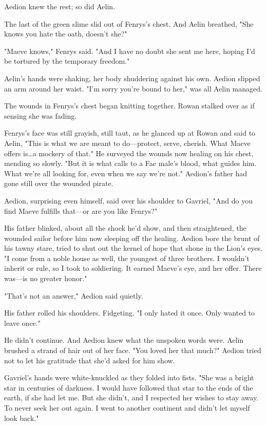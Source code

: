 Aedion knew the rest; so did Aelin.

The last of the green slime slid out of Fenrys's chest.
And Aelin breathed, "She knows you hate the oath, doesn't she?"

"Maeve knows," Fenrys said.
"And I have no doubt she sent me here, hoping I'd be tortured by the temporary freedom."

Aelin's hands were shaking, her body shuddering against his own.
Aedion slipped an arm around her waist.
"I'm sorry you're bound to her," was all Aelin managed.

The wounds in Fenrys's chest began knitting together.
Rowan stalked over as if sensing she was fading.

Fenrys's face was still grayish, still taut, as he glanced up at Rowan and said to Aelin, "This is what we are meant to do---protect, serve, cherish.
What Maeve offers is\ldots a mockery of that."
He surveyed the wounds now healing on his chest, mending so slowly.
"But it is what calls to a Fae male's blood, what guides him.
What we're all looking for, even when we say we're not."
Aedion's father had gone still over the wounded pirate.

Aedion, surprising even himself, said over his shoulder to Gavriel, "And do you find Maeve fulfills that---or are you like Fenrys?"

His father blinked, about all the shock he'd show, and then straightened, the wounded sailor before him now sleeping off the healing.
Aedion bore the brunt of his tawny stare, tried to shut out the kernel of hope that shone in the Lion's eyes.
"I come from a noble house as well, the youngest of three brothers.
I wouldn't inherit or rule, so I took to soldiering.
It earned Maeve's eye, and her offer.
There was---is no greater honor."

"That's not an answer," Aedion said quietly.

His father rolled his shoulders.
Fidgeting.
"I only hated it once.
Only wanted to leave once."

He didn't continue.
And Aedion knew what the unspoken words were.
Aelin brushed a strand of hair out of her face.
"You loved her that much?"
Aedion tried not to let his gratitude that she'd asked for him show.

Gavriel's hands were white-knuckled as they folded into fists.
"She was a bright star in centuries of darkness.
I would have followed that star to the ends of the earth, if she had let me.
But she didn't, and I respected her wishes to stay away.
To never seek her out again.
I went to another continent and didn't let myself look back."

